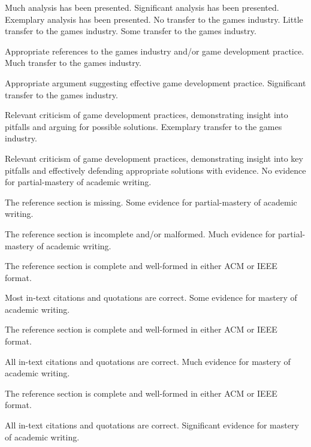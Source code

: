 \documentclass{../fal_assignment}
\begin{document}
\begin{markingrubric}
        \grade 		Much analysis has been presented.
        \grade 		Significant analysis has been presented.
        \grade 		Exemplary analysis has been presented.
%
        \grade\fail 	No transfer to the games industry.
        \grade 		Little transfer to the games industry.
        \grade 		Some transfer to the games industry. 
        \par 		Appropriate references to the games industry and/or game development practice. 
        \grade 		Much transfer to the games industry.
        \par 		Appropriate argument suggesting effective game development practice. 
        \grade 		Significant transfer to the games industry.
        \par 		Relevant criticism of game development practices, demonstrating insight into pitfalls and arguing for possible solutions. 
        \grade 		Exemplary transfer to the games industry.
        \par 		Relevant criticism of game development practices, demonstrating insight into key pitfalls and effectively defending appropriate solutions with evidence. 
%
        \grade\fail 	No evidence for partial-mastery of academic writing.
        \par 		The reference section is missing.
        \grade 		Some evidence for partial-mastery of academic writing.
        \par 		The reference section is incomplete and/or malformed.
        \grade 		Much evidence for partial-mastery of academic writing.
        \par 		The reference section is complete and well-formed in either ACM or IEEE format.
        \par 		Most in-text citations and quotations are correct.
        \grade 		Some evidence for mastery of academic writing.
        \par 		The reference section is complete and well-formed in either ACM or IEEE format.
        \par 		All in-text citations and quotations are correct.
        \grade 		Much evidence for mastery of academic writing.
        \par 		The reference section is complete and well-formed in either ACM or IEEE format.
        \par 		All in-text citations and quotations are correct.
        \grade 		Significant evidence for mastery of academic writing.

\end{markingrubric}
\end{document}
